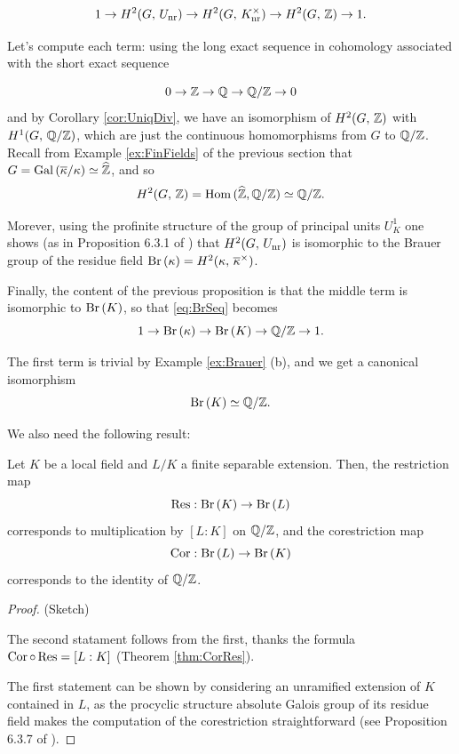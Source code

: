\documentclass[a4paper, oneside]{memoir}
\begin{document}
\begin{equation}\label{eq:BrSeq}
	1\to H^{2}( G, \, U_{\text{nr}} )\to H^{2}( G, \, K_{\text{nr}}^\times )\to H^{2}( G, \, \mathbb{Z} )\to 1.
\end{equation}

Let's compute each term: using the long exact sequence in cohomology associated with the short exact sequence

\[
	0\to\mathbb{Z}\to\mathbb{Q}\to\mathbb{Q}/\mathbb{Z}\to 0
\]
and by Corollary \ref{cor:UniqDiv}, we have an isomorphism of $H^{2}( G, \, \mathbb{Z} )$ with $H^{1}( G, \, \mathbb{Q}/\mathbb{Z} )$, which are just the continuous homomorphisms from $G$ to $\mathbb{Q}/\mathbb{Z}$. Recall from Example
\ref{ex:FinFields} of the previous
section that $G=\operatorname{Gal}{(\overline{\kappa}/\kappa)}\simeq\widehat{\mathbb{Z}}$, and so
\[
	H^{2}( G, \, \mathbb{Z} )=\operatorname{Hom}{(\widehat{\mathbb{Z}},\mathbb{Q}/\mathbb{Z})}\simeq\mathbb{Q}/\mathbb{Z}.
\]

Morever, using the profinite structure of the group of principal units $U_K^1$ one shows (as in Proposition 6.3.1 of \cite{GilleSzamuely}) that $H^{2}( G, \, U_{\text{nr}} )$ is isomorphic to
the Brauer group of the residue field $\operatorname{Br}{(\kappa)}=H^{2}( \kappa, \, \overline{\kappa}^\times )$.

Finally, the content of the previous proposition is that the middle term is isomorphic to $\operatorname{Br}{(K)}$, so that \eqref{eq:BrSeq} becomes
\[
	1\to\operatorname{Br}{(\kappa)}\to\operatorname{Br}{(K)}\to\mathbb{Q}/\mathbb{Z}\to 1.
\]

The first term is trivial by Example \ref{ex:Brauer} (b), and we get a canonical isomorphism
\begin{equation}\label{eq:BrK}
	\operatorname{Br}{(K)}\simeq\mathbb{Q}/\mathbb{Z}.
\end{equation}

We also need the following result:

\begin{proposition}\label{prop:BrCorRes}
	Let $K$ be a local field and $L/K$ a finite separable extension. Then, the restriction map
	\[
		\operatorname{Res}: \operatorname{Br}{(K)}\to\operatorname{Br}{(L)}
	\]
	corresponds to multiplication by $[L:K]$ on $\mathbb{Q}/\mathbb{Z}$,
	and the corestriction map
	\[
		\operatorname{Cor}: \operatorname{Br}{(L)}\to\operatorname{Br}{(K)}
	\]
	corresponds to the identity of $\mathbb{Q}/\mathbb{Z}$.
\end{proposition}

\begin{proof}{(Sketch)}

	The second statament follows from the first, thanks the formula $\operatorname{Cor} \circ \operatorname{Res} = [L:K]$ (Theorem \ref{thm:CorRes}).

	The first statement can be shown by considering an unramified extension of $K$ contained in $L$, as the procyclic structure absolute Galois group of its residue field makes the computation of the corestriction
	straightforward (see Proposition 6.3.7 of \cite{GilleSzamuely}).
\end{proof}
\end{document}
